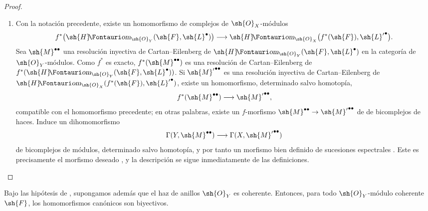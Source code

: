 \documentclass[oneside]{amsart}
\makeatletter
\newcommand{\ega@arrow}[2]{\mathchoice{#1}{#2}{#2}{#2}}
\renewcommand{\to}{\ega@arrow{\longrightarrow}{\rightarrow}}
\newcommand*{\ega@sheafop}[3]{\sh{#1}#2\textup{\kern-2.2pt{\Fontauri\slshape #3}}}
\newcommand*{\shHom}{\ega@sheafop{H}{}{om}}
\let\EGAOriginalLabel\label
\renewcommand{\label}[1]{\phantomsection\EGAOriginalLabel{#1}}
\makeatother
\begin{document}
\begin{proof}
\begin{enumerate}
  \item[\rm(ii)]
  Con la notación precedente, existe un homomorfismo de complejos de
  $\sh{O}_X$-módulos
  \[
    f^*\bigl(\shHom_{\sh{O}_Y}(\sh{F},\sh{L}^\bullet)\bigr)
    \longrightarrow
    \shHom_{\sh{O}_X}
      \bigl(f^*(\sh{F}),{\sh{L}'}^\bullet\bigr).
  \]
  Sea $\sh{M}^{\bullet\bullet}$ una resolución inyectiva de
  Cartan--Eilenberg de
  $\shHom_{\sh{O}_Y}(\sh{F},\sh{L}^\bullet)$ en la categoría de
  $\sh{O}_Y$-módulos.  Como $f^*$ es exacto,
  $f^*(\sh{M}^{\bullet\bullet})$ es una resolución de Cartan--Eilenberg de
  $f^*(\shHom_{\sh{O}_Y}(\sh{F},\sh{L}^\bullet))$.
  Si ${\sh{M}'}^{\bullet\bullet}$ es una resolución inyectiva de
  Cartan--Eilenberg de
  $\shHom_{\sh{O}_X}(f^*(\sh{F}),{\sh{L}'}^\bullet)$, existe
   un homomorfismo, determinado salvo homotopía,
  \[
    f^*(\sh{M}^{\bullet\bullet})
    \longrightarrow{\sh{M}'}^{\bullet\bullet},
  \]
  compatible con el homomorfismo precedente; en otras palabras, existe
  un $f$-morfismo
  $\sh{M}^{\bullet\bullet}\to{\sh{M}'}^{\bullet\bullet}$ de
  de bicomplejos de haces.
  Induce un dihomomorfismo
  \[
    \Gamma(Y,\sh{M}^{\bullet\bullet})
    \longrightarrow\Gamma(X,{\sh{M}'}^{\bullet\bullet})
  \]
  de bicomplejos de módulos, determinado salvo homotopía, y por tanto
  un morfismo bien definido de sucesiones espectrales
  .  Este es precisamente el morfismo deseado
  , y la descripción
   se sigue inmediatamente de las definiciones.
\end{enumerate}
\end{proof}

\begin{proposition}[12.3.5]
\label{0.12.3.5}
Bajo las hipótesis de , supongamos además que el
haz de anillos $\sh{O}_Y$ es coherente.
Entonces, para todo $\sh{O}_Y$-módulo coherente $\sh{F}$, los
homomorfismos canónicos  son biyectivos.
\end{proposition}
\end{document}

